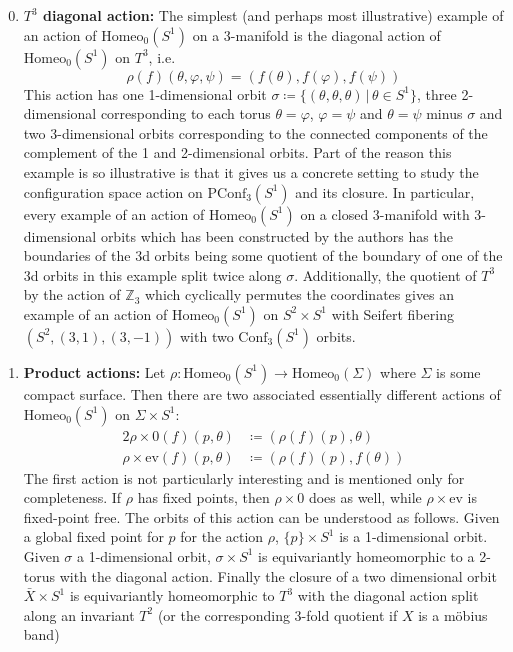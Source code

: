 \documentclass[10pt, oneside]{article}
\newcommand{\Z}{\mathbb{Z}}
\newcommand{\homeo}[1][S^1]{\text{Homeo}_0(#1)}
\newcommand{\conf}[2][S^1]{\text{Conf}_{#2}(#1)}
\newcommand{\pconf}[2][S^1]{\text{PConf}_{#2}(#1)}
\theoremstyle{definition}
\theoremstyle{definition}
\begin{document}
\begin{enumerate}
    \setcounter{enumi}{-1}
    \item {\bf $T^3$ diagonal action:} The simplest (and perhaps most illustrative) example of an action of $\homeo$ on a 3-manifold is the diagonal action of $\homeo$ on $T^3$, i.e.$$\rho(f)(\theta, \varphi, \psi) = (f(\theta), f(\varphi), f(\psi))$$ This action has one 1-dimensional orbit $\sigma \coloneqq \{(\theta,\theta,\theta)\,\vert\,\theta\in S^1\}$, three 2-dimensional corresponding to each torus $\theta=\varphi$, $\varphi=\psi$ and $\theta=\psi$ minus $\sigma$ and two 3-dimensional orbits corresponding to the connected components of the complement of the 1 and 2-dimensional orbits. Part of the reason this example is so illustrative is that it gives us a concrete setting to study the configuration space action on $\pconf{3}$ and its closure. In particular, every example of an action of $\homeo$ on a closed 3-manifold with 3-dimensional orbits which has been constructed by the authors has the boundaries of the 3d orbits being some quotient of the boundary of one of the 3d orbits in this example split twice along $\sigma$. Additionally, the quotient of $T^3$ by the action of $\Z_3$ which cyclically permutes the coordinates gives an example of an action of $\homeo$ on $S^2\times S^1$ with Seifert fibering $(S^2, (3, 1), (3, -1))$ with two $\conf{3}$ orbits.


    \item {\bf Product actions:} Let $\rho:\homeo[S^1]\to\homeo[\Sigma]$ where $\Sigma$ is some compact surface. Then there are two associated essentially different actions of $\homeo[S^1]$ on $\Sigma\times S^1$:
    \begin{alignat*}{2}
        \rho\times 0(f)(p, \theta) &\coloneqq (\rho(f)(p), \theta) \\
        \rho\times \text{ev}(f)(p, \theta) &\coloneqq (\rho(f)(p), f(\theta))
    \end{alignat*}
    The first action is not particularly interesting and is mentioned only for completeness. If $\rho$ has fixed points, then $\rho\times 0$ does as well, while $\rho\times \text{ev}$ is fixed-point free. The orbits of this action can be understood as follows. Given a global fixed point for $p$ for the action $\rho$, $\{p\}\times S^1$ is a 1-dimensional orbit. Given $\sigma$ a 1-dimensional orbit, $\sigma\times S^1$ is equivariantly homeomorphic to a 2-torus with the diagonal action. Finally the closure of a two dimensional orbit $\bar{X}\times S^1$ is equivariantly homeomorphic to $T^3$ with the diagonal action split along an invariant $T^2$ (or the corresponding 3-fold quotient if $X$ is a m\"{o}bius band)
\end{enumerate}
\end{document}
